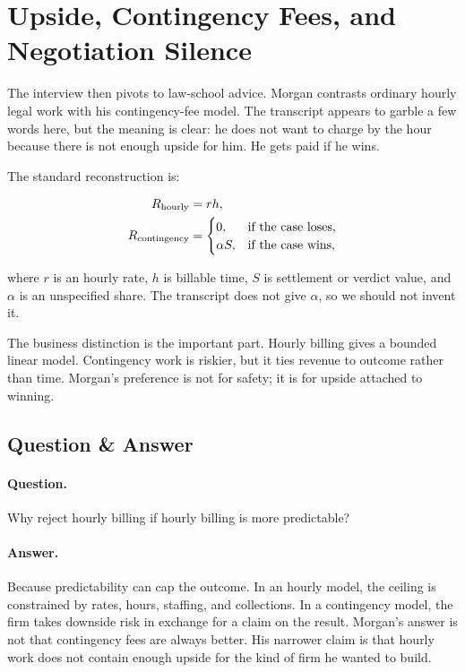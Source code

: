 \section{Upside, Contingency Fees, and Negotiation Silence}

The interview then pivots to law-school advice. Morgan contrasts ordinary hourly legal work with his contingency-fee model. The transcript appears to garble a few words here, but the meaning is clear: he does not want to charge by the hour because there is not enough upside for him. He gets paid if he wins.

The standard reconstruction is:

\begin{align}
R_{\mathrm{hourly}} &= r h,\\
R_{\mathrm{contingency}} &=
\begin{cases}
0, & \hbox{if the case loses},\\
\alpha S, & \hbox{if the case wins},
\end{cases}
\end{align}

where \(r\) is an hourly rate, \(h\) is billable time, \(S\) is settlement or verdict value, and \(\alpha\) is an unspecified share. The transcript does not give \(\alpha\), so we should not invent it.

The business distinction is the important part. Hourly billing gives a bounded linear model. Contingency work is riskier, but it ties revenue to outcome rather than time. Morgan's preference is not for safety; it is for upside attached to winning.

\subsection{Question \& Answer}

\paragraph{Question.}
Why reject hourly billing if hourly billing is more predictable?

\paragraph{Answer.}
Because predictability can cap the outcome. In an hourly model, the ceiling is constrained by rates, hours, staffing, and collections. In a contingency model, the firm takes downside risk in exchange for a claim on the result. Morgan's answer is not that contingency fees are always better. His narrower claim is that hourly work does not contain enough upside for the kind of firm he wanted to build.

